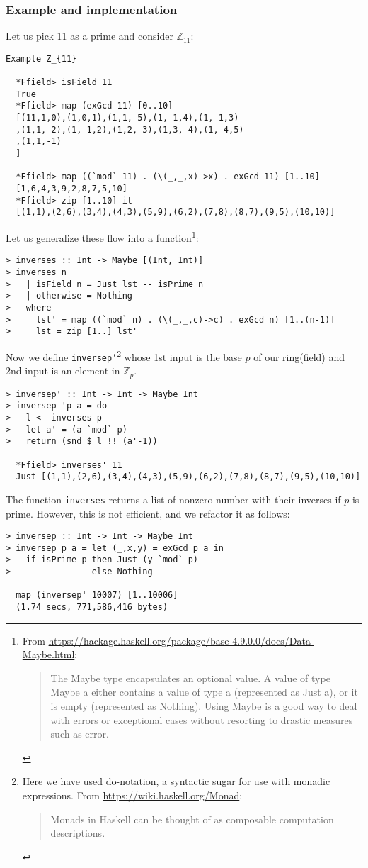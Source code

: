 \documentclass[11pt]{book}
\begin{document}
\subsubsection{Example and implementation}
Let us pick 11 as a prime and consider $\mathbb{Z}_{11}$:
\begin{verbatim}
Example Z_{11}

  *Ffield> isField 11
  True
  *Ffield> map (exGcd 11) [0..10]
  [(11,1,0),(1,0,1),(1,1,-5),(1,-1,4),(1,-1,3)
  ,(1,1,-2),(1,-1,2),(1,2,-3),(1,3,-4),(1,-4,5)
  ,(1,1,-1)
  ]

  *Ffield> map ((`mod` 11) . (\(_,_,x)->x) . exGcd 11) [1..10] 
  [1,6,4,3,9,2,8,7,5,10]
  *Ffield> zip [1..10] it
  [(1,1),(2,6),(3,4),(4,3),(5,9),(6,2),(7,8),(8,7),(9,5),(10,10)]
\end{verbatim}
Let us generalize these flow into a function\footnote{
From \url{https://hackage.haskell.org/package/base-4.9.0.0/docs/Data-Maybe.html}:
\begin{quotation}
The Maybe type encapsulates an optional value. 
A value of type Maybe a either contains a value of type a (represented as Just a), or it is empty (represented as Nothing). 
Using Maybe is a good way to deal with errors or exceptional cases without resorting to drastic measures such as error.
\end{quotation}
}:
\begin{verbatim}
> inverses :: Int -> Maybe [(Int, Int)]
> inverses n
>   | isField n = Just lst -- isPrime n
>   | otherwise = Nothing
>   where
>     lst' = map ((`mod` n) . (\(_,_,c)->c) . exGcd n) [1..(n-1)]
>     lst = zip [1..] lst'
\end{verbatim}
Now we define \texttt{inversep'}\footnote{
Here we have used do-notation, a syntactic sugar for use with monadic expressions.
From \url{https://wiki.haskell.org/Monad}:
\begin{quotation}
Monads in Haskell can be thought of as composable computation descriptions.
\end{quotation}
} whose 1st input is the base $p$ of our ring(field) and 2nd input is an element in $\mathbb{Z}_p$.
\begin{verbatim}
> inversep' :: Int -> Int -> Maybe Int
> inversep 'p a = do
>   l <- inverses p
>   let a' = (a `mod` p)
>   return (snd $ l !! (a'-1)) 
   
  *Ffield> inverses' 11
  Just [(1,1),(2,6),(3,4),(4,3),(5,9),(6,2),(7,8),(8,7),(9,5),(10,10)]
\end{verbatim}
The function \texttt{inverses} returns a list of nonzero number with their inverses if $p$ is prime.
However, this is not efficient, and we refactor it as follows:
\begin{verbatim}
> inversep :: Int -> Int -> Maybe Int
> inversep p a = let (_,x,y) = exGcd p a in
>   if isPrime p then Just (y `mod` p)
>                else Nothing

  map (inversep' 10007) [1..10006]
  (1.74 secs, 771,586,416 bytes)
\end{verbatim}
\end{document}
